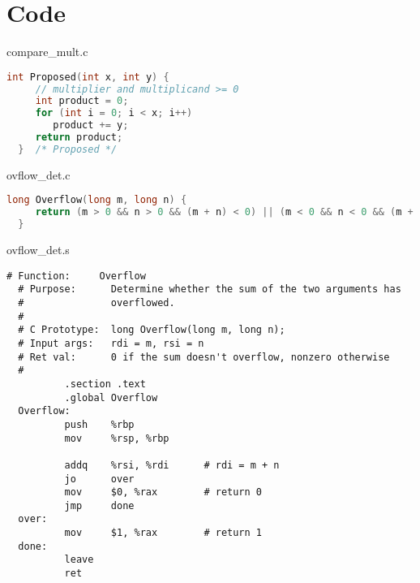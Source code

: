 \documentclass[paper=a4, fontsize=11pt]{scrartcl} %
\begin{document}
\pagebreak

\section{Code}

\begin{fancyquotes}
    compare\_mult.c
\end{fancyquotes}

\begin{lstlisting}[language=C]
  int Proposed(int x, int y) {
     // multiplier and multiplicand >= 0
     int product = 0;
     for (int i = 0; i < x; i++)
        product += y;
     return product;
  }  /* Proposed */
\end{lstlisting}

\begin{fancyquotes}
    ovflow\_det.c
\end{fancyquotes}

\begin{lstlisting}[language=C]
  long Overflow(long m, long n) {
     return (m > 0 && n > 0 && (m + n) < 0) || (m < 0 && n < 0 && (m + n) > 0);
  }
\end{lstlisting}

\begin{fancyquotes}
    ovflow\_det.s
\end{fancyquotes}

\begin{lstlisting}[language={[mips]Assembler}]
  # Function:     Overflow
  # Purpose:      Determine whether the sum of the two arguments has
  #               overflowed.
  #
  # C Prototype:  long Overflow(long m, long n);
  # Input args:   rdi = m, rsi = n
  # Ret val:      0 if the sum doesn't overflow, nonzero otherwise
  #
          .section .text
          .global Overflow
  Overflow:
          push    %rbp
          mov     %rsp, %rbp

          addq    %rsi, %rdi      # rdi = m + n
          jo      over
          mov     $0, %rax        # return 0
          jmp     done
  over:
          mov     $1, %rax        # return 1
  done:
          leave
          ret
\end{lstlisting}

\pagebreak
\end{document}
